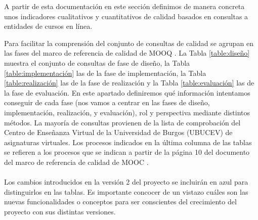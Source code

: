 A partir de esta documentación en este sección definimos de manera concreta unos indicadores cualitativos y cuantitativos de calidad basados en consultas a entidades de cursos en línea.

Para facilitar la comprensión del conjunto de consultas de calidad se agrupan en las fases del marco de referencia de calidad de MOOQ \cite{stracke2018quality}. La Tabla \ref{table:diseño} muestra el  conjunto  de consultas de  fase de diseño, la Tabla \ref{table:implementación} las de la fase de implementación, la Tabla \ref{table:realización} las de la fase de realización y la Tabla \ref{table:evaluación} las de la fase de evaluación.
En este apartado definiremos qué información intentamos conseguir de cada fase (nos vamos a centrar en las fases de diseño, implementación, realización, y evaluación), rol y perspectiva mediante distintos métodos. La mayoría de consultas provienen de la lista de comprobación del Centro de Enseñanza Virtual de la Universidad de Burgos (UBUCEV) de asignaturas virtuales.
Los procesos indicados en la última columna de las tablas se refieren a los procesos que se indican a partir de la página 10 del documento del marco de referencia de calidad de MOOC \cite{stracke2018quality}. \\
\\
Los cambios introducidos en la versión 2 del proyecto se incluirán en azul para distinguirlos en las tablas. Es importante concocer de un vistazo cuáles son las nuevas funcionalidades o conceptos para ser conscientes del crecimiento del proyecto con sus distintas versiones.

